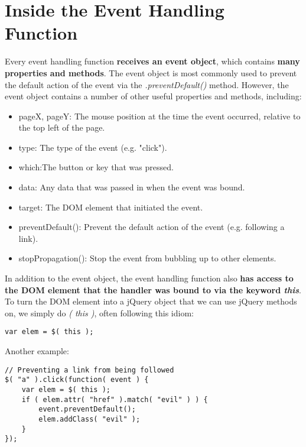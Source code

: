 \documentclass[10pt,letterpaper]{report}
\begin{document}
\section{Inside the Event Handling Function}
Every event handling function \textbf{receives an event object}, which contains \textbf{many properties and methods}. The event object is most commonly used to prevent the default action of the event via the \textit{.preventDefault()} method. However, the event object contains a number of other useful properties and methods, including:
\begin{itemize}
\item pageX, pageY: The mouse position at the time the event occurred, relative to the top left of the page.
\item type: The type of the event (e.g. "click").
\item which:The button or key that was pressed.
\item data: Any data that was passed in when the event was bound.
\item target: The DOM element that initiated the event.
\item preventDefault(): Prevent the default action of the event (e.g. following a link).
\item stopPropagation(): Stop the event from bubbling up to other elements.
\end{itemize}
In addition to the event object, the event handling function also \textbf{has access to the DOM element that the handler was bound to via the keyword \textit{this}}.\\ To turn the DOM element into a jQuery object that we can use jQuery methods on, we simply do \textit{\textdollar( this )}, often following this idiom:
\begin{lstlisting}
var elem = $( this );
\end{lstlisting}
Another example:
\begin{lstlisting}
// Preventing a link from being followed
$( "a" ).click(function( event ) {
	var elem = $( this );
	if ( elem.attr( "href" ).match( "evil" ) ) {
		event.preventDefault();
		elem.addClass( "evil" );
	}
});
\end{lstlisting}
\end{document}
